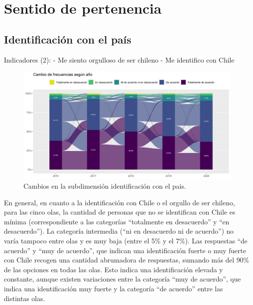 \documentclass[
  12pt,
]{book}
\begin{document}
\hypertarget{sentido-de-pertenencia-1}{%
\section{Sentido de pertenencia}\label{sentido-de-pertenencia-1}}

\hypertarget{identificaciuxf3n-con-el-pauxeds}{%
\subsection{Identificación con el país}\label{identificaciuxf3n-con-el-pauxeds}}

Indicadores (2):
- Me siento orgulloso de ser chileno
- Me identifico con Chile

\begin{figure}[H]

{\centering \includegraphics[width=1\linewidth,height=1\textheight]{output/graphs/alluvial_identificacion} 

}

\caption{Cambios en la subdimensión identificación con el pais.}\label{fig:alluvial-identificacion}
\end{figure}

En general, en cuanto a la identificación con Chile o el orgullo de ser chileno, para las cinco olas, la cantidad de personas que no se identifican con Chile es mínima (correspondiente a las categorías ``totalmente en desacuerdo'' y ``en desacuerdo''). La categoría intermedia (``ni en desacuerdo ni de acuerdo'') no varía tampoco entre olas y es muy baja (entre el 5\% y el 7\%). Las respuestas ``de acuerdo'' y ``muy de acuerdo'', que indican una identificación fuerte o muy fuerte con Chile recogen una cantidad abrumadora de respuestas, sumando más del 90\% de las opciones en todas las olas. Esto indica una identificación elevada y constante, aunque existen variaciones entre la categoría ``muy de acuerdo'', que indica una identificación muy fuerte y la categoría ``de acuerdo'' entre las distintas olas.
\end{document}

